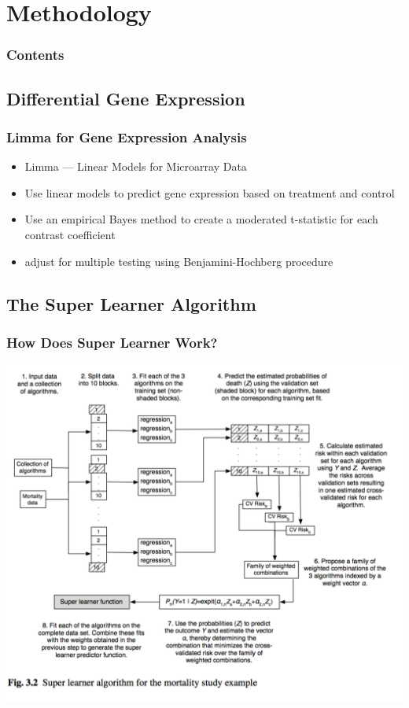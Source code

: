 \documentclass{beamer}
\begin{document}
\section{Methodology}

\begin{frame}
        \frametitle{Contents}
        \tableofcontents[currentsection,currentsubsection,hideothersubsections,sectionstyle=show/shaded]
\end{frame}

\subsection{Differential Gene Expression}

\begin{frame}[fragile]
  	\frametitle{Limma for Gene Expression Analysis}
 		\begin{itemize}
			\item Limma --- Linear Models for Microarray Data
			\item Use linear models to predict gene expression based on treatment and control
			\item Use an empirical Bayes method to create a moderated t-statistic for each contrast coefficient
			\item adjust for multiple testing using Benjamini-Hochberg procedure
		\end{itemize}
\end{frame}

\subsection{The Super Learner Algorithm}

\begin{frame}
	\frametitle{How Does Super Learner Work?}
		\begin{center}
    			\includegraphics[scale=0.45]{../paper/figs/SuperLearn2.png}
		\end{center}
\end{frame}
\end{document}
